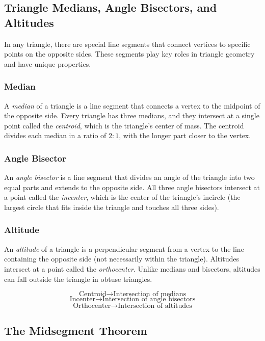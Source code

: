 \subsection{Triangle Medians, Angle Bisectors, and Altitudes}

In any triangle, there are special line segments that connect vertices to specific points on the 
opposite sides. These segments play key roles in triangle geometry and have unique properties.

\subsubsection*{Median}

A \emph{median} of a triangle is a line segment that connects a vertex to the midpoint of the opposite 
side. Every triangle has three medians, and they intersect at a single point called the \emph{centroid}, 
which is the triangle’s center of mass. The centroid divides each median in a ratio of \( 2:1 \), with 
the longer part closer to the vertex.

\subsubsection*{Angle Bisector}

An \emph{angle bisector} is a line segment that divides an angle of the triangle into two equal parts and 
extends to the opposite side. All three angle bisectors intersect at a point called the \emph{incenter}, 
which is the center of the triangle's incircle (the largest circle that fits inside the triangle and 
touches all three sides).

\subsubsection*{Altitude}

An \emph{altitude} of a triangle is a perpendicular segment from a vertex to the line containing the 
opposite side (not necessarily within the triangle). Altitudes intersect at a point called the 
\emph{orthocenter}. Unlike medians and bisectors, altitudes can fall outside the triangle in obtuse 
triangles.

\[
	\text{Centroid} \rightarrow \text{Intersection of medians}\]
\[
	\text{Incenter} \rightarrow \text{Intersection of angle bisectors}\]
\[
	\text{Orthocenter} \rightarrow \text{Intersection of altitudes}
\]

\subsection{The Midsegment Theorem}

